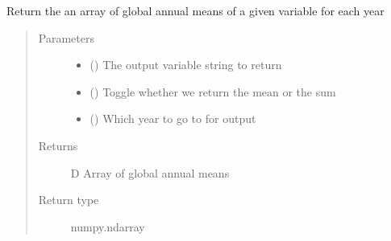 \documentclass[letterpaper,10pt,english]{sphinxmanual}
\begin{document}
\begin{fulllineitems}
\begin{fulllineitems}
\begin{quote}
\begin{description}
\end{description}\end{quote}

\end{fulllineitems}


\begin{fulllineitems}
\label{\detokenize{source/exoplasim:exoplasim.Model.gethistory}}
Return the an array of global annual means of a given variable for each year
\begin{quote}\begin{description}
\item[{Parameters}] \leavevmode\begin{itemize}
\item {} 
 (\sphinxstyleliteralemphasis{\sphinxupquote{, }}) \textendash{} The output variable string to return

\item {} 
 (\sphinxstyleliteralemphasis{\sphinxupquote{, }}) \textendash{} Toggle whether we return the mean or the sum

\item {} 
 (\sphinxstyleliteralemphasis{\sphinxupquote{, }}) \textendash{} Which year to go to for output

\end{itemize}

\item[{Returns}] \sphinxhyphen{}D Array of global annual means

\item[{Return type}] \leavevmode
numpy.ndarray

\end{description}\end{quote}


\end{fulllineitems}
\end{fulllineitems}
\end{document}
